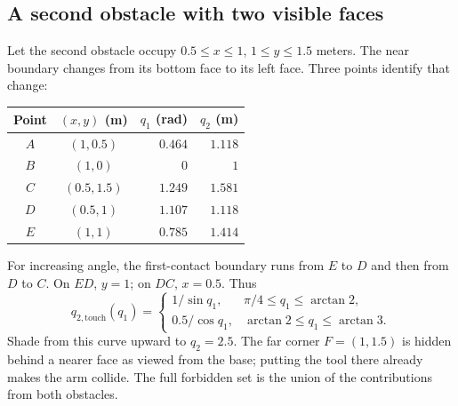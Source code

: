 \subsection{A second obstacle with two visible faces}
Let the second obstacle occupy $0.5\le x\le1$, $1\le y\le1.5$ meters.
The near boundary changes from its bottom face to its left face. Three
points identify that change:
\begin{center}
\begin{tabular}{ccrr}
\toprule
Point & $(x,y)$ (m) & $q_1$ (rad) & $q_2$ (m)\\
\midrule
$A$ & $(1,0.5)$ & $0.464$ & $1.118$\\
$B$ & $(1,0)$ & $0$ & $1$\\
$C$ & $(0.5,1.5)$ & $1.249$ & $1.581$\\
$D$ & $(0.5,1)$ & $1.107$ & $1.118$\\
$E$ & $(1,1)$ & $0.785$ & $1.414$\\
\bottomrule
\end{tabular}
\end{center}
For increasing angle, the first-contact boundary runs from $E$ to $D$
and then from $D$ to $C$. On $ED$, $y=1$; on $DC$, $x=0.5$. Thus
\begin{equation}
 q_{2,\mathrm{touch}}(q_1)=
 \begin{cases}
 1/\sin q_1,&\pi/4\le q_1\le\arctan 2,\\
 0.5/\cos q_1,&\arctan 2\le q_1\le\arctan 3.
 \end{cases}
 \label{eq:l13-second}
\end{equation}
Shade from this curve upward to $q_2=2.5$. The far corner $F=(1,1.5)$
is hidden behind a nearer face as viewed from the base; putting the tool
there already makes the arm collide. The full forbidden set is the union
of the contributions from both obstacles.

